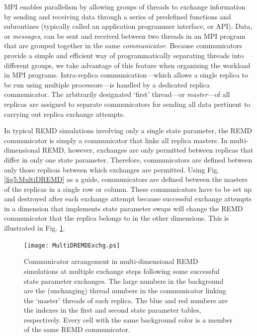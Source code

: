 MPI enables parallelism by allowing groups of threads to exchange information by
sending and receiving data through a series of predefined functions and
subroutines (typically called an application programmer interface, or API).
Data, or \emph{messages}, can be sent and received between two threads in an MPI
program that are grouped together in the same \emph{communicator}. Because
communicators provide a simple and efficient way of programmatically separating
threads into different groups, we take advantage of this feature when organizing
the workload in MPI programs. Intra-replica communication---which allows a
single replica to be run using multiple processors---is handled by a dedicated
replica communicator. The arbitrarily designated `first' thread---or
\emph{master}---of all replicas are assigned to separate communicators for
sending all data pertinent to carrying out replica exchange attempts.

In typical REMD simulations involving only a single state parameter, the REMD
communicator is simply a communicator that links all replica masters. In
multi-dimensional REMD, however, exchanges are only permitted between replicas
that differ in only one state parameter. Therefore, communicators are defined
between only those replicas between which exchanges are permitted. Using Fig.
\ref{fig5:MultiDREMD} as a guide, communicators are defined between the masters
of the replicas in a single row or column. These communicators have to be set up
and destroyed after each exchange attempt because successful exchange attempts
in a dimension that implements state parameter swaps will change the REMD
communicator that the replica belongs to in the other dimensions. This is
illustrated in Fig. \ref{fig5:MultiDREMDExchg}.

\begin{figure}
   \texttt{[image: MultiDREMDExchg.ps]}
   \caption{Communicator arrangement in multi-dimensional REMD simulations at
            multiple exchange steps following some successful state parameter
            exchanges. The large numbers in the background are the (unchanging)
            thread numbers in the communicator linking the `master' threads of
            each replica. The blue and red numbers are the indexes in the first
            and second state parameter tables, respectively. Every cell with the
            same background color is a member of the same REMD communicator.}
   \label{fig5:MultiDREMDExchg}
\end{figure}
